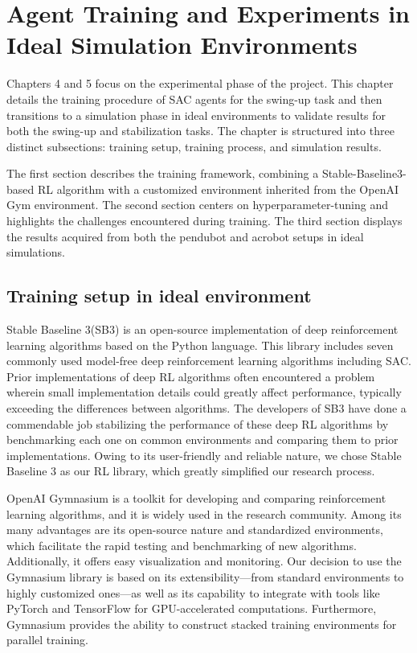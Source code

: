 \chapter{Agent Training and Experiments in Ideal Simulation Environments}
Chapters 4 and 5 focus on the experimental phase of the project. This chapter details the training procedure of SAC agents for the swing-up task and then transitions to a simulation phase in ideal environments to validate results for both the swing-up and stabilization tasks. The chapter is structured into three distinct subsections: training setup, training process, and simulation results.

The first section describes the training framework, combining a Stable-Baseline3-based RL algorithm with a customized environment inherited from the OpenAI Gym environment. The second section centers on hyperparameter-tuning and highlights the challenges encountered during training. The third section displays the results acquired from both the pendubot and acrobot setups in ideal simulations.

\section{Training setup in ideal environment}
Stable Baseline 3(SB3)\cite{stable-baselines3} is an open-source implementation of deep reinforcement learning algorithms based on the Python language. This library includes seven commonly used model-free deep reinforcement learning algorithms including SAC. Prior implementations of deep RL algorithms often encountered a problem wherein small implementation details could greatly affect performance, typically exceeding the differences between algorithms\cite{islam2017reproducibility}. The developers of SB3 have done a commendable job stabilizing the performance of these deep RL algorithms by benchmarking each one on common environments and comparing them to prior implementations. Owing to its user-friendly and reliable nature, we chose Stable Baseline 3 as our RL library, which greatly simplified our research process.

OpenAI Gymnasium\cite{towers_gymnasium_2023} is a toolkit for developing and comparing reinforcement learning algorithms, and it is widely used in the research community. Among its many advantages are its open-source nature and standardized environments, which facilitate the rapid testing and benchmarking of new algorithms. Additionally, it offers easy visualization and monitoring. Our decision to use the Gymnasium library is based on its extensibility—from standard environments to highly customized ones—as well as its capability to integrate with tools like PyTorch and TensorFlow for GPU-accelerated computations. Furthermore, Gymnasium provides the ability to construct stacked training environments for parallel training.

